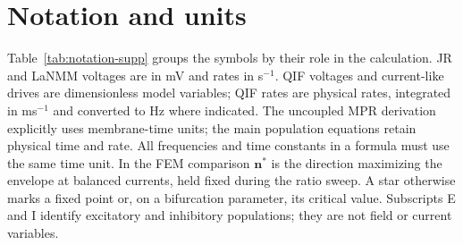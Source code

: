 \documentclass[11pt,a4paper]{article}
\newif\ifappendices
\providecommand{\DIFaddtex}[1]{{\protect\color{blue} \sf #1}} %
\providecommand{\DIFaddbegin}{} %
\providecommand{\DIFaddend}{} %
\providecommand{\DIFadd}[1]{\texorpdfstring{\DIFaddtex{#1}}{#1}} %
\begin{document}
\section*{Notation and units}\label{app:notation-supp}
\def\notationtablelabel{tab:notation-supp}
Table~\ref{\notationtablelabel} groups the symbols by their role in the calculation.
\DIFaddbegin \ifappendices\else {}\fi
\DIFaddend JR and LaNMM voltages are in mV and rates in s$^{-1}$. QIF voltages and current-like
drives are dimensionless model variables; QIF rates are physical rates, integrated
in ms$^{-1}$ and converted to Hz where indicated. The uncoupled MPR derivation explicitly uses membrane-time units; the main
population equations retain physical time and rate. All frequencies and time
constants in a formula must use the same time unit. In the FEM comparison $\mathbf n^*$ is the direction maximizing the envelope
at balanced currents, held fixed during the ratio sweep. A star otherwise marks a fixed point or,
on a bifurcation parameter, its critical value. Subscripts E and I identify
excitatory and inhibitory populations; they are not field or current variables.
\end{document}
